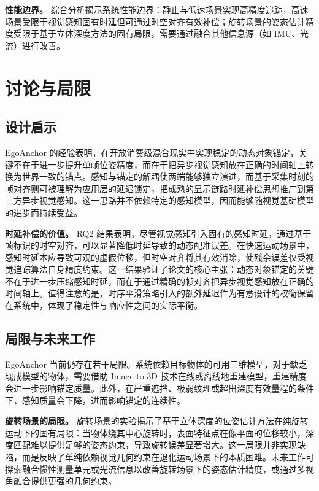 \documentclass[review]{vgtc}
\begin{document}
\textbf{性能边界。} 综合分析揭示系统性能边界：静止与低速场景实现高精度追踪，高速场景受限于视觉感知固有时延但可通过时空对齐有效补偿；旋转场景的姿态估计精度受限于基于立体深度方法的固有局限，需要通过融合其他信息源（如 IMU、光流）进行改善。

\section{讨论与局限}\label{sec:discussion}


\subsection{设计启示}


EgoAnchor 的经验表明，在开放消费级混合现实中实现稳定的动态对象锚定，关键不在于进一步提升单帧位姿精度，而在于把异步视觉感知放在正确的时间轴上转换为世界一致的锚点。感知与锚定的解耦使两端能够独立演进，而基于采集时刻的帧对齐则可被理解为应用层的延迟锁定，把成熟的显示链路时延补偿思想推广到第三方异步视觉感知。这一思路并不依赖特定的感知模型，因而能够随视觉基础模型的进步而持续受益。

\textbf{时延补偿的价值。} RQ2 结果表明，尽管视觉感知引入固有的感知时延，通过基于帧标识的时空对齐，可以显著降低时延导致的动态配准误差。在快速运动场景中，感知时延本应导致可观的虚假位移，但时空对齐将其有效消除，使残余误差仅受视觉追踪算法自身精度约束。这一结果验证了论文的核心主张：动态对象锚定的关键不在于进一步压缩感知时延，而在于通过精确的帧对齐把异步视觉感知放在正确的时间轴上。值得注意的是，时序平滑策略引入的额外延迟作为有意设计的权衡保留在系统中，体现了稳定性与响应性之间的实际平衡。

\subsection{局限与未来工作}


EgoAnchor 当前仍存在若干局限。系统依赖目标物体的可用三维模型，对于缺乏现成模型的物体，需要借助 Image-to-3D 技术在线或离线地重建模型，重建精度会进一步影响锚定质量。此外，在严重遮挡、极弱纹理或超出深度有效量程的条件下，感知质量会下降，进而影响锚定的连续性。

\textbf{旋转场景的局限。} 旋转场景的实验揭示了基于立体深度的位姿估计方法在纯旋转运动下的固有局限：当物体绕其中心旋转时，表面特征点在像平面的位移较小，深度匹配难以提供足够的姿态约束，导致旋转误差显著增大。这一局限并非实现缺陷，而是反映了单纯依赖视觉几何约束在退化运动场景下的本质困难。未来工作可探索融合惯性测量单元或光流信息以改善旋转场景下的姿态估计精度，或通过多视角融合提供更强的几何约束。
\end{document}
